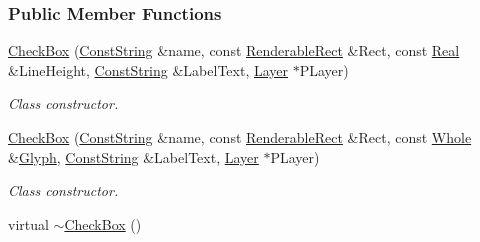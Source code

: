 \subsubsection*{Public Member Functions}
\begin{DoxyCompactItemize}
\item 
\hyperlink{classMezzanine_1_1UI_1_1CheckBox_a818afe38244e1cd196c65bf36bf1719a}{CheckBox} (\hyperlink{namespaceMezzanine_a63cd699ac54b73953f35ec9cfc05e506}{ConstString} \&name, const \hyperlink{structMezzanine_1_1UI_1_1RenderableRect}{RenderableRect} \&Rect, const \hyperlink{namespaceMezzanine_a726731b1a7df72bf3583e4a97282c6f6}{Real} \&LineHeight, \hyperlink{namespaceMezzanine_a63cd699ac54b73953f35ec9cfc05e506}{ConstString} \&LabelText, \hyperlink{classMezzanine_1_1UI_1_1Layer}{Layer} $\ast$PLayer)
\begin{DoxyCompactList}\small\item\em Class constructor. \item\end{DoxyCompactList}\item 
\hyperlink{classMezzanine_1_1UI_1_1CheckBox_aedc495e50db3adf0ed51b3c28107af3f}{CheckBox} (\hyperlink{namespaceMezzanine_a63cd699ac54b73953f35ec9cfc05e506}{ConstString} \&name, const \hyperlink{structMezzanine_1_1UI_1_1RenderableRect}{RenderableRect} \&Rect, const \hyperlink{namespaceMezzanine_adcbb6ce6d1eb4379d109e51171e2e493}{Whole} \&\hyperlink{classMezzanine_1_1UI_1_1Glyph}{Glyph}, \hyperlink{namespaceMezzanine_a63cd699ac54b73953f35ec9cfc05e506}{ConstString} \&LabelText, \hyperlink{classMezzanine_1_1UI_1_1Layer}{Layer} $\ast$PLayer)
\begin{DoxyCompactList}\small\item\em Class constructor. \item\end{DoxyCompactList}\item 
\hypertarget{classMezzanine_1_1UI_1_1CheckBox_a3881a44a1149755ea60e6329ad852b3b}{
virtual \hyperlink{classMezzanine_1_1UI_1_1CheckBox_a3881a44a1149755ea60e6329ad852b3b}{$\sim$CheckBox} ()}
\label{classMezzanine_1_1UI_1_1CheckBox_a3881a44a1149755ea60e6329ad852b3b}


\end{DoxyCompactItemize}
